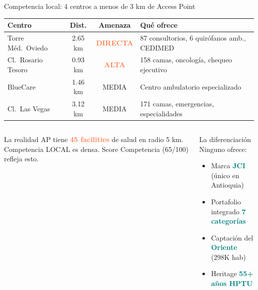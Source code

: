 \documentclass[aspectratio=169, 11pt]{beamer}
\newcommand{\highlight}[1]{\textcolor{teal}{\textbf{#1}}}
\newcommand{\danger}[1]{\textcolor{coral}{\textbf{#1}}}
\newcommand{\src}[1]{\par\vspace{2pt}{\tiny\textcolor{slate}{Fuente: #1}}}
\begin{document}
\begin{frame}{Competencia local: 4 centros a menos de 3 km de Access Point}
\vspace{-4pt}
\begin{center}
{\scriptsize
\begin{tabular}{@{}p{3cm}ccp{4.5cm}@{}}
\toprule
\textbf{Centro} & \textbf{Dist.} & \textbf{Amenaza} & \textbf{Qué ofrece} \\
\midrule
\rowcolor{coral!10}
Torre Méd.\ Oviedo & 2.65 km & \danger{DIRECTA} & 87 consultorios, 6 quirófanos amb., CEDIMED \\
Cl.\ Rosario Tesoro & 0.93 km & \danger{ALTA} & 158 camas, oncología, chequeo ejecutivo \\
\rowcolor{coral!6}
BlueCare & 1.46 km & MEDIA & Centro ambulatorio especializado \\
Cl.\ Las Vegas & 3.12 km & MEDIA & 171 camas, emergencias, especialidades \\
\bottomrule
\end{tabular}
}
\end{center}

\vspace{2pt}
\begin{columns}[T]
\begin{alertblock}{\small La realidad}
\scriptsize
AP tiene \danger{45 facilities} de salud en radio 5 km. Competencia LOCAL es densa. Score Competencia (65/100) refleja esto.
\end{alertblock}

\begin{exampleblock}{\small La diferenciación}
\scriptsize
Ninguno ofrece:
\begin{itemize}\setlength{\itemsep}{0pt}
  \item Marca \highlight{JCI} (único en Antioquia)
  \item Portafolio integrado \highlight{7 categorías}
  \item Captación del \highlight{Oriente} (298K hab)
  \item Heritage \highlight{55+ años HPTU}
\end{itemize}
\end{exampleblock}
\end{columns}
\src{Google Places API, OSM Overpass, REPS (b4dp-ximh)}
\end{frame}
\end{document}
